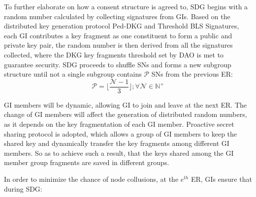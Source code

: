 To further elaborate on how a consent structure is agreed to, SDG begins with a random number calculated by collecting signatures from GIs. Based on the distributed key generation protocol Ped-DKG\cite{dkg} and Threshold BLS Signatures\cite{bls}, each GI contributes a key fragment as one constituent to form a public and private key pair, the random number is then derived from all the signatures collected, where the DKG key fragments threshold set by DAO is met to guarantee security. SDG proceeds to shuffle SNs and forms a new subgroup structure until not a single subgroup contains $\mathcal{P}$ SNs from the previous ER:
\begin{equation}
\label{BFT}
\mathcal{P}=\lfloor\frac{\mathcal{N}-1}{3}\rfloor; \forall \mathcal{N} \in \mathbb{N}^+
\end{equation}

GI members will be dynamic, allowing GI to join and leave at the next ER. The change of GI members will affect the generation of distributed random numbers, as it depends on the key fragmentation of each GI member. Proactive secret sharing protocol is adopted\cite{pss,pss2}, which allows a group of GI members to keep the shared key and dynamically transfer the key fragments among different GI members. So as to achieve such a result, that the keys shared among the GI member group fragments are saved in different groups.

In order to minimize the chance of node collusions, at the $e^{th}$ ER, GIs ensure that during SDG:


